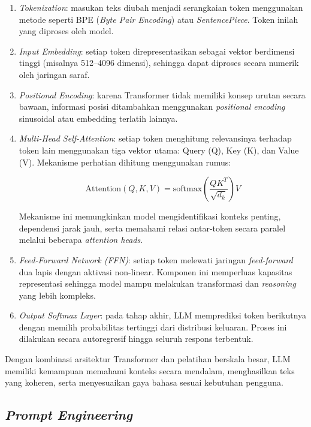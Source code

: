 \begin{enumerate}
    \item \textit{Tokenization}: masukan teks diubah menjadi serangkaian token menggunakan metode seperti BPE (\textit{Byte Pair Encoding}) atau \textit{SentencePiece}. Token inilah yang diproses oleh model.

    \item \textit{Input Embedding}: setiap token direpresentasikan sebagai vektor berdimensi tinggi (misalnya 512--4096 dimensi), sehingga dapat diproses secara numerik oleh jaringan saraf.

    \item \textit{Positional Encoding}: karena Transformer tidak memiliki konsep urutan secara bawaan, informasi posisi ditambahkan menggunakan \textit{positional encoding} sinusoidal atau embedding terlatih lainnya.

    \item \textit{Multi-Head Self-Attention}: setiap token menghitung relevansinya terhadap token lain menggunakan tiga vektor utama: Query (Q), Key (K), dan Value (V). Mekanisme perhatian dihitung menggunakan rumus:

    \[
        \text{Attention}(Q, K, V) = \text{softmax}\left( \frac{QK^{T}}{\sqrt{d_k}} \right) V
    \]

    Mekanisme ini memungkinkan model mengidentifikasi konteks penting, dependensi jarak jauh, serta memahami relasi antar-token secara paralel melalui beberapa \textit{attention heads}.

    \item \textit{Feed-Forward Network (FFN)}: setiap token melewati jaringan \textit{feed-forward} dua lapis dengan aktivasi non-linear. Komponen ini memperluas kapasitas representasi sehingga model mampu melakukan transformasi dan \textit{reasoning} yang lebih kompleks.

    \item \textit{Output Softmax Layer}: pada tahap akhir, LLM memprediksi token berikutnya dengan memilih probabilitas tertinggi dari distribusi keluaran. Proses ini dilakukan secara autoregresif hingga seluruh respons terbentuk.
\end{enumerate}

Dengan kombinasi arsitektur Transformer dan pelatihan berskala besar, LLM memiliki kemampuan memahami konteks secara mendalam, menghasilkan teks yang koheren, serta menyesuaikan gaya bahasa sesuai kebutuhan pengguna.


\subsection{\textit{Prompt Engineering}}

